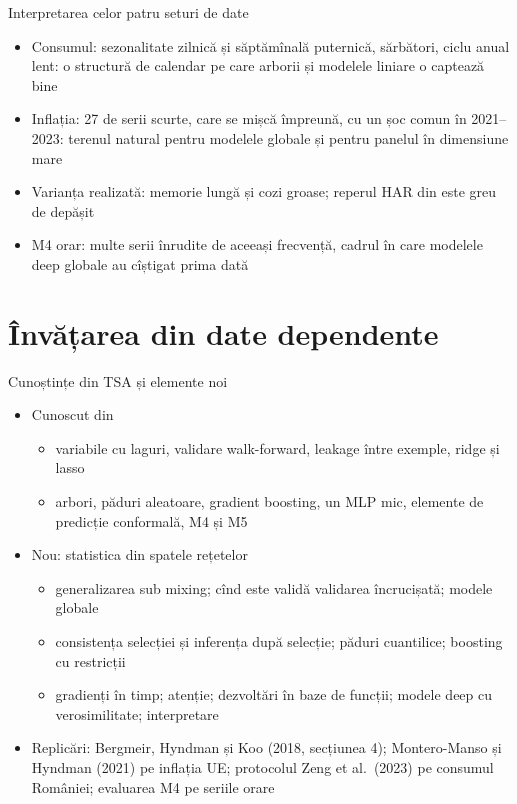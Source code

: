 \begin{frame}{Interpretarea celor patru seturi de date}
\itemsize{\small}
\begin{itemize}
    \item Consumul: sezonalitate zilnică și săptămînală puternică, sărbători, ciclu anual lent: o structură de calendar pe care arborii și modelele liniare o captează bine
    \item Inflația: 27 de serii scurte, care se mișcă împreună, cu un șoc comun în 2021--2023: terenul natural pentru modelele globale și pentru panelul în dimensiune mare
    \item Varianța realizată: memorie lungă și cozi groase; reperul HAR din  este greu de depășit
    \item M4 orar: multe serii înrudite de aceeași frecvență, cadrul în care modelele deep globale au cîștigat prima dată
\end{itemize}
\end{frame}


\section{Învățarea din date dependente}

\begin{frame}{Cunoștințe din TSA și elemente noi}
\itemsize{\small}
\begin{itemize}
    \item Cunoscut din 
    \begin{itemize}
        \item variabile cu laguri, validare walk-forward, leakage între exemple, ridge și lasso
        \item arbori, păduri aleatoare, gradient boosting, un MLP mic, elemente de predicție conformală, M4 și M5
    \end{itemize}
    \item Nou: statistica din spatele rețetelor
    \begin{itemize}
        \item generalizarea sub mixing; cînd este validă validarea încrucișată; modele globale
        \item consistența selecției și inferența după selecție; păduri cuantilice; boosting cu restricții
        \item gradienți în timp; atenție; dezvoltări în baze de funcții; modele deep cu verosimilitate; interpretare
    \end{itemize}
    \item Replicări: Bergmeir, Hyndman și Koo (2018, secțiunea 4); Montero-Manso și Hyndman (2021) pe inflația UE; protocolul Zeng et al.\ (2023) pe consumul României; evaluarea M4 pe seriile orare
\end{itemize}
\end{frame}

